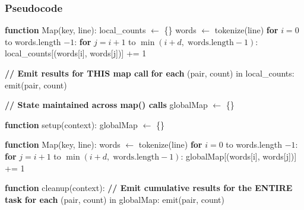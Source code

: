 \documentclass[12pt,a4paper]{article}
\begin{document}
\subsubsection{Pseudocode}

\begin{algorithm}
\caption{Map-Function Level Local Aggregation}
\begin{algorithmic}[1]

\State \textbf{function} Map(key, line):
\State \quad local\_counts $\gets$ \{\} 
\State \quad words $\gets$ tokenize(line)
\State \quad \textbf{for} $i = 0$ to words.length $- 1$:
\State \qquad \textbf{for} $j = i + 1$ to $\min(i + d,\; \text{words.length} - 1)$:
\State \qquad\quad local\_counts[(words[i], words[j])] += 1

\vspace{0.5em}
\State \quad \textbf{// Emit results for THIS map call}
\State \quad \textbf{for each} (pair, count) in local\_counts:
\State \qquad emit(pair, count)

\end{algorithmic}
\end{algorithm}



\begin{algorithm}
\caption{Map-Class Level Local Aggregation}
\begin{algorithmic}[1]

\State \textbf{// State maintained across map() calls}
\State globalMap $\gets$ \{\} 

\State \textbf{function} setup(context):
\State \quad globalMap $\gets$ \{\} 

\State \textbf{function} Map(key, line):
\State \quad words $\gets$ tokenize(line)
\State \quad \textbf{for} $i = 0$ to words.length $- 1$:
\State \qquad \textbf{for} $j = i + 1$ to $\min(i + d,\; \text{words.length} - 1)$:
\State \qquad\quad globalMap[(words[i], words[j])] += 1

\State \textbf{function} cleanup(context):
\State \quad \textbf{// Emit cumulative results for the ENTIRE task}
\State \quad \textbf{for each} (pair, count) in globalMap:
\State \qquad emit(pair, count)

\end{algorithmic}
\end{algorithm}
\end{document}
